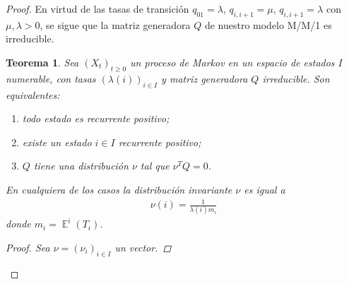 \documentclass{article}
\DeclareMathOperator{\Exp}{\mathbb{E}}
\newtheorem{theorem}{Teorema}
\theoremstyle{definition}
\begin{document}
\begin{proof}
En virtud de las tasas de transición \(q_{01} = \lambda\), \(q_{i, i + 1} = \mu\), \(q_{i, i + 1} = \lambda\) con \(\mu, \lambda > 0\), se sigue que la matriz generadora \(Q\) de nuestro modelo M/M/1 es irreducible.

\begin{theorem} %
Sea \((X_t)_{t \geq 0}\) un proceso de Markov en un espacio de estados \(I\) numerable, con tasas \((\lambda(i))_{i \in I}\) y matriz generadora \(Q\) irreducible.
Son equivalentes:
\begin{enumerate}
	\item todo estado es recurrente positivo;
	\item existe un estado \(i \in I\) recurrente positivo;
	\item \(Q\) tiene una distribución \(\nu\) tal que \(\nu^{T} Q = 0\).
\end{enumerate}
En cualquiera de los casos la distribución invariante \(\nu\) es igual a
\begin{align}
	\nu(i) = \frac{1}{\lambda(i) m_i}
\end{align}
donde \(m_i = \Exp^i(T_i)\).

\begin{proof}
Sea \(\nu = (\nu_i)_{i \in I}\) un vector.


\end{proof}
\end{theorem}
\end{proof}
\end{document}
